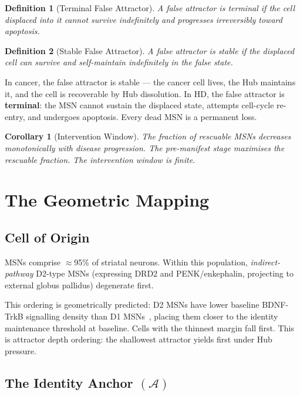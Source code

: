 \documentclass[12pt,a4paper]{article}
\newtheorem{corollary}{Corollary}
\newtheorem{definition}{Definition}
\newcommand{\IA}{\mathcal{A}}
\begin{document}
\begin{definition}[Terminal False Attractor]
A false attractor is \emph{terminal} if the cell displaced
into it cannot survive indefinitely and progresses
irreversibly toward apoptosis.
\end{definition}

\begin{definition}[Stable False Attractor]
A false attractor is \emph{stable} if the displaced cell
can survive and self-maintain indefinitely in the false
state.
\end{definition}

In cancer, the false attractor is stable --- the cancer cell
lives, the Hub maintains it, and the cell is recoverable
by Hub dissolution. In HD, the false attractor is
\textbf{terminal}: the MSN cannot sustain the displaced
state, attempts cell-cycle re-entry, and undergoes
apoptosis. Every dead MSN is a permanent loss.

\begin{corollary}[Intervention Window]
The fraction of rescuable MSNs decreases monotonically with
disease progression. The pre-manifest stage maximises the
rescuable fraction. The intervention window is finite.
\end{corollary}

\section{The Geometric Mapping}

\subsection{Cell of Origin}

MSNs comprise $\approx$95\% of striatal neurons.
Within this population, \emph{indirect-pathway} D2-type
MSNs (expressing DRD2 and PENK/enkephalin, projecting
to external globus pallidus) degenerate first.

This ordering is geometrically predicted: D2 MSNs have
lower baseline BDNF-TrkB signalling density than D1
MSNs~\cite{Oxford2024}, placing them closer to the identity
maintenance threshold at baseline. Cells with the thinnest
margin fall first. This is attractor depth ordering: the
shallowest attractor yields first under Hub pressure.

\subsection{The Identity Anchor \texorpdfstring{$(\IA)$}{(A)}}
\end{document}

